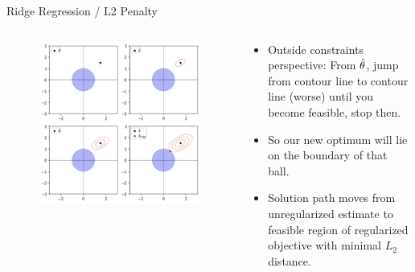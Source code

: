 \documentclass[11pt,compress,t,notes=noshow, xcolor=table]{beamer}
\begin{document}
\begin{vbframe}{Ridge Regression / L2 Penalty}
\framebreak

\begin{columns}
\begin{column}{0.5\textwidth}
\lz
\begin{figure}
\includegraphics[width=\textwidth]{figure/ridge_outside.png}
\end{figure}
\end{column}

\begin{column}{0.5\textwidth}
\begin{footnotesize} 
\lz \lz
\begin{itemize}
	\item Outside constraints perspective: From $\hat{\theta}$, jump from contour line to contour line (worse) until you become feasible, stop then.
  \item So our new optimum will lie on the boundary of that ball.
  \item Solution path moves from unregularized estimate to feasible region of regularized objective with minimal $L_2$ distance.
\end{itemize}
\end{footnotesize}
\end{column}
\end{columns}

\framebreak


\end{vbframe}
\end{document}
